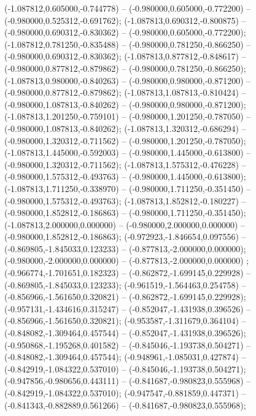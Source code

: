 (-1.087812,0.605000,-0.744778) -- (-0.980000,0.605000,-0.772200) -- (-0.980000,0.525312,-0.691762);
 (-1.087813,0.690312,-0.800875) -- (-0.980000,0.690312,-0.830362) -- (-0.980000,0.605000,-0.772200);
 (-1.087812,0.781250,-0.835488) -- (-0.980000,0.781250,-0.866250) -- (-0.980000,0.690312,-0.830362);
 (-1.087813,0.877812,-0.848617) -- (-0.980000,0.877812,-0.879862) -- (-0.980000,0.781250,-0.866250);
 (-1.087813,0.980000,-0.840263) -- (-0.980000,0.980000,-0.871200) -- (-0.980000,0.877812,-0.879862);
 (-1.087813,1.087813,-0.810424) -- (-0.980000,1.087813,-0.840262) -- (-0.980000,0.980000,-0.871200);
 (-1.087813,1.201250,-0.759101) -- (-0.980000,1.201250,-0.787050) -- (-0.980000,1.087813,-0.840262);
 (-1.087813,1.320312,-0.686294) -- (-0.980000,1.320312,-0.711562) -- (-0.980000,1.201250,-0.787050);
 (-1.087813,1.445000,-0.592003) -- (-0.980000,1.445000,-0.613800) -- (-0.980000,1.320312,-0.711562);
 (-1.087813,1.575312,-0.476228) -- (-0.980000,1.575312,-0.493763) -- (-0.980000,1.445000,-0.613800);
 (-1.087813,1.711250,-0.338970) -- (-0.980000,1.711250,-0.351450) -- (-0.980000,1.575312,-0.493763);
 (-1.087813,1.852812,-0.180227) -- (-0.980000,1.852812,-0.186863) -- (-0.980000,1.711250,-0.351450);
 (-1.087813,2.000000,0.000000) -- (-0.980000,2.000000,0.000000) -- (-0.980000,1.852812,-0.186863);
 (-0.972923,-1.846654,0.097556) -- (-0.869805,-1.845033,0.123233) -- (-0.877813,-2.000000,0.000000);
 (-0.980000,-2.000000,0.000000) -- (-0.877813,-2.000000,0.000000) ;
 (-0.966774,-1.701651,0.182323) -- (-0.862872,-1.699145,0.229928) -- (-0.869805,-1.845033,0.123233);
 (-0.961519,-1.564463,0.254758) -- (-0.856966,-1.561650,0.320821) -- (-0.862872,-1.699145,0.229928);
 (-0.957131,-1.434616,0.315247) -- (-0.852047,-1.431938,0.396526) -- (-0.856966,-1.561650,0.320821);
 (-0.953587,-1.311679,0.364104) -- (-0.848082,-1.309464,0.457544) -- (-0.852047,-1.431938,0.396526);
 (-0.950868,-1.195268,0.401582) -- (-0.845046,-1.193738,0.504271) -- (-0.848082,-1.309464,0.457544);
 (-0.948961,-1.085031,0.427874) -- (-0.842919,-1.084322,0.537010) -- (-0.845046,-1.193738,0.504271);
 (-0.947856,-0.980656,0.443111) -- (-0.841687,-0.980823,0.555968) -- (-0.842919,-1.084322,0.537010);
 (-0.947547,-0.881859,0.447371) -- (-0.841343,-0.882889,0.561266) -- (-0.841687,-0.980823,0.555968);
